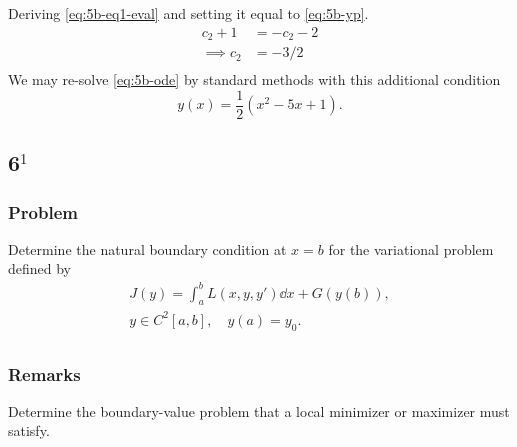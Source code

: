 \documentclass[12pt,twoside]{article}
\begin{document}
Deriving \cref{eq:5b-eq1-eval} and setting it equal to \cref{eq:5b-yp}.
\begin{equation*}
  \begin{aligned}
    c_2 + 1 &= -c_2 - 2 \\
    \implies c_2 &= -3/2 \\
  \end{aligned}
\end{equation*}
We may re-solve \cref{eq:5b-ode} by standard methods with this additional condition
\begin{equation*}
\boxed{y(x) = \frac{1}{2} \left(x^2-5 x+1\right).}
\end{equation*}

\subsection{6$^1$}
\subsubsection*{Problem}
Determine the natural boundary condition at $x=b$ for the variational problem
defined by
\begin{equation}
  \begin{aligned}
    J(y) = \int_a^b L(x,y,y')\dd{x}+G(y(b)), \\
    y\in C^2[a,b],\quad y(a)=y_0. \\
  \end{aligned}
\end{equation}
\subsubsection*{Remarks}
Determine the boundary-value problem that a local minimizer or maximizer must
satisfy.
\end{document}
